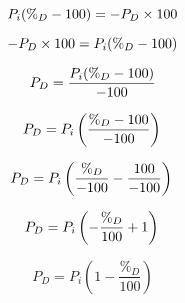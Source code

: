 \documentclass[10pt]{article}         %
\begin{document}
$$
P_i(\%_D-100)=-P_D\times 100 \\
$$

$$
-P_D\times 100=P_i(\%_D-100) \\
$$

$$
P_D=\frac{P_i(\%_D-100)}{-100} \\
$$

$$
P_D=P_i\left (\frac{\%_D-100}{-100}  \right ) \\
$$

$$
P_D=P_i\left (\frac{\%_D}{-100}-\frac{100}{-100}  \right ) \\
$$

$$
P_D=P_i\left (-\frac{\%_D}{100}+1  \right ) \\
$$

$$
P_D=P_i\left (1-\frac{\%_D}{100}  \right )
$$
\end{document}
